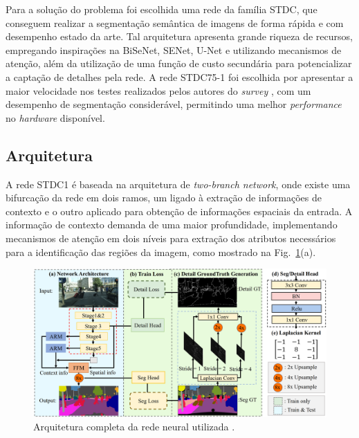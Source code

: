 \documentclass[conference]{IEEEtran}
\begin{document}
Para a solução do problema foi escolhida uma rede da família STDC, que conseguem realizar a segmentação semântica de imagens de forma rápida e com desempenho estado da arte. Tal arquitetura apresenta grande riqueza de recursos, empregando inspirações na BiSeNet, SENet, U-Net e utilizando mecanismos de atenção, além da utilização de uma função de custo secundária para potencializar a captação de detalhes pela rede. A rede STDC75-1 foi escolhida por apresentar a maior velocidade nos testes realizados pelos autores do \textit{survey} \cite{papadeas2021RealTimeSemanticImage}, com um desempenho de segmentação considerável, permitindo uma melhor \textit{performance} no \textit{hardware} disponível.

\subsection{Arquitetura}

A rede STDC1 \cite{fan2021RethinkingBiSeNetRealtime} é baseada na arquitetura de \textit{two-branch network}, onde existe uma bifurcação da rede em dois ramos, um ligado à extração de informações de contexto e o outro aplicado para obtenção de informações espaciais da entrada. A informação de contexto demanda de uma maior profundidade, implementando mecanismos de atenção em dois níveis para extração dos atributos necessários para a identificação das regiões da imagem, como mostrado na Fig.~\ref{fig:stdcseg-architecture}(a).

\begin{figure}[h!]
	\centering
	\includegraphics[width=1\linewidth]{img/stdcseg-architecture}
	\caption{Arquitetura completa da rede neural utilizada \cite{fan2021RethinkingBiSeNetRealtime}.}
	\label{fig:stdcseg-architecture}
\end{figure}
\end{document}
